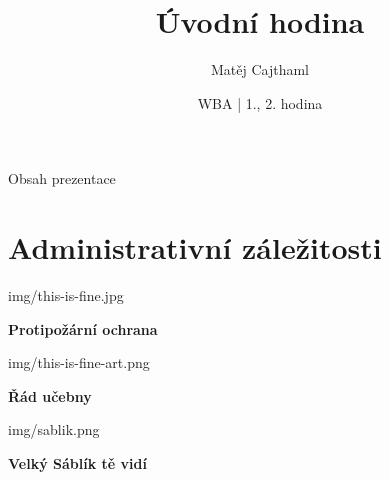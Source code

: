 \documentclass[aspectratio=169]{beamer}
\title{Úvodní hodina}
\date{WBA | 1., 2. hodina}
\author[Cajthaml]{Matěj Cajthaml}
\begin{document}
\begin{frame}
\titlepage
\end{frame}

\begin{frame}{Obsah prezentace}
    \begin{cardTiny}
        \begin{minipage}{\textwidth}
            \vspace{1ex}
            \tableofcontents
        \end{minipage}
    \end{cardTiny}
\end{frame}



\section{Administrativní záležitosti}

\begin{frameImg}{img/this-is-fine.jpg}
    \vspace*{60mm}
    \begin{cardTiny}
        \vspace*{\fill}
        \begin{center}
            \textbf{Protipožární ochrana}
        \end{center}
    \end{cardTiny}
\end{frameImg}

\begin{frameImg}[height]{img/this-is-fine-art.png}
    \vspace*{60mm}
    \begin{cardTiny}
        \vspace*{\fill}
        \begin{center}
            \textbf{Řád učebny}
        \end{center}
    \end{cardTiny}
\end{frameImg}

\begin{frameImg}[height]{img/sablik.png}
    \vspace*{60mm}
    \begin{cardTiny}
        \vspace*{\fill}
        \begin{center}
            \textbf{Velký Sáblík tě vidí}
        \end{center}
    \end{cardTiny}
\end{frameImg}
\end{document}
